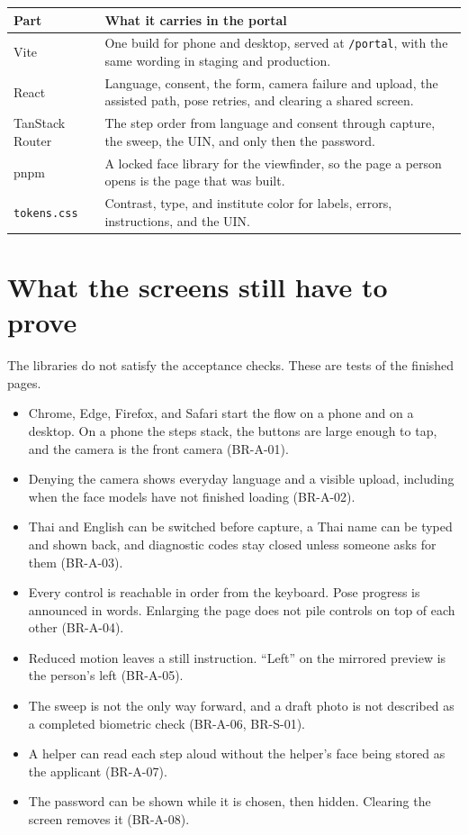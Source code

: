 \documentclass[11pt]{article}
\begin{document}
\begin{center}
\small
\renewcommand{\arraystretch}{1.2}
\begin{tabularx}{\textwidth}{@{}>{\raggedright\arraybackslash}p{3.1cm} >{\raggedright\arraybackslash}X@{}}
\toprule
\textbf{Part} & \textbf{What it carries in the portal} \\
\midrule
Vite &
One build for phone and desktop, served at \texttt{/portal}, with the same wording in staging and production. \\
\addlinespace
React &
Language, consent, the form, camera failure and upload, the assisted path, pose retries, and clearing a shared screen. \\
\addlinespace
TanStack Router &
The step order from language and consent through capture, the sweep, the UIN, and only then the password. \\
\addlinespace
pnpm &
A locked face library for the viewfinder, so the page a person opens is the page that was built. \\
\addlinespace
\texttt{tokens.css} &
Contrast, type, and institute color for labels, errors, instructions, and the UIN. \\
\bottomrule
\end{tabularx}
\end{center}

\section{What the screens still have to prove}

The libraries do not satisfy the acceptance checks. These are tests of the finished pages.

\begin{itemize}
  \item Chrome, Edge, Firefox, and Safari start the flow on a phone and on a desktop. On a phone the steps stack, the buttons are large enough to tap, and the camera is the front camera (BR-A-01).
  \item Denying the camera shows everyday language and a visible upload, including when the face models have not finished loading (BR-A-02).
  \item Thai and English can be switched before capture, a Thai name can be typed and shown back, and diagnostic codes stay closed unless someone asks for them (BR-A-03).
  \item Every control is reachable in order from the keyboard. Pose progress is announced in words. Enlarging the page does not pile controls on top of each other (BR-A-04).
  \item Reduced motion leaves a still instruction. ``Left'' on the mirrored preview is the person's left (BR-A-05).
  \item The sweep is not the only way forward, and a draft photo is not described as a completed biometric check (BR-A-06, BR-S-01).
  \item A helper can read each step aloud without the helper's face being stored as the applicant (BR-A-07).
  \item The password can be shown while it is chosen, then hidden. Clearing the screen removes it (BR-A-08).
\end{itemize}
\end{document}
